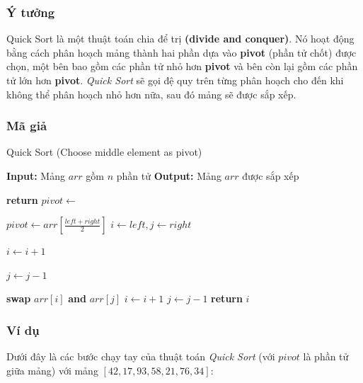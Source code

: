 \subsubsection{Ý tưởng}
Quick Sort là một thuật toán chia để trị \textbf{(divide and conquer)}. Nó hoạt động bằng cách phân hoạch mảng thành hai phần dựa vào \textbf{pivot} (phần tử chốt) được chọn, một bên bao gồm các phần tử nhỏ hơn \textbf{pivot} và bên còn lại gồm các phần tử lớn hơn \textbf{pivot}. \textit{Quick Sort} sẽ gọi đệ quy trên từng phân hoạch cho đến khi không thể phân hoạch nhỏ hơn nữa, sau đó mảng sẽ được sắp xếp.\cite{fasha2021comparative}

\subsubsection{Mã giả}
\begin{algorithm}[H]
\caption{Quick Sort (Choose middle element as pivot)}
\begin{algorithmic}[1]
    \State \textbf{Input:} Mảng $arr$ gồm $n$ phần tử 
    \State \textbf{Output:} Mảng $arr$ được sắp xếp
    \State {}
\EndProcedure

        \State \textbf{return}
    \EndIf
    \State $pivot \gets$ 
    \State {}
    \State {}
\EndProcedure

    \State $pivot \gets arr[\frac{left + right}{2}]$
    \State $i \gets left, j \gets right$

            \State $i \gets i + 1$
        \EndWhile
    
            \State $j \gets j - 1$
        \EndWhile
    
            \State \textbf{swap} $arr[i]$ \textbf{and} $arr[j]$
            \State $i \gets i + 1$
            \State $j \gets j - 1$
        \EndIf
    \EndWhile
    \State \textbf{return} $i$
\EndProcedure
\end{algorithmic}
\end{algorithm}

\subsubsection{Ví dụ}
Dưới đây là các bước chạy tay của thuật toán \textit{Quick Sort} (với $pivot$ là phần tử giữa mảng) với mảng $[42, 17, 93, 58, 21, 76, 34]$:

